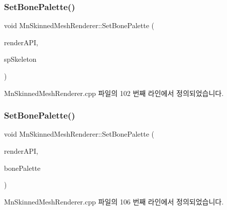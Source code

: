 \subsubsection{\texorpdfstring{Set\+Bone\+Palette()}{SetBonePalette()}\hspace{0.1cm}{\footnotesize\ttfamily [1/2]}}
{\footnotesize\ttfamily void Mn\+Skinned\+Mesh\+Renderer\+::\+Set\+Bone\+Palette (\begin{DoxyParamCaption}\item[{\hyperlink{class_m_n_l_1_1_mn_render_a_p_i}{Mn\+Render\+A\+PI} \&}]{render\+A\+PI,  }\item[{const std\+::shared\+\_\+ptr$<$ \hyperlink{class_m_n_l_1_1_mn_skeleton}{Mn\+Skeleton} $>$}]{sp\+Skeleton }\end{DoxyParamCaption})}



Mn\+Skinned\+Mesh\+Renderer.\+cpp 파일의 102 번째 라인에서 정의되었습니다.

\mbox{\label{class_m_n_l_1_1_mn_skinned_mesh_renderer_aca8b64e27a78b22b8550f46baa39df6a}} 
\subsubsection{\texorpdfstring{Set\+Bone\+Palette()}{SetBonePalette()}\hspace{0.1cm}{\footnotesize\ttfamily [2/2]}}
{\footnotesize\ttfamily void Mn\+Skinned\+Mesh\+Renderer\+::\+Set\+Bone\+Palette (\begin{DoxyParamCaption}\item[{\hyperlink{class_m_n_l_1_1_mn_render_a_p_i}{Mn\+Render\+A\+PI} \&}]{render\+A\+PI,  }\item[{const D3\+D11\+\_\+\+S\+U\+B\+R\+E\+S\+O\+U\+R\+C\+E\+\_\+\+D\+A\+TA}]{bone\+Palette }\end{DoxyParamCaption})}



Mn\+Skinned\+Mesh\+Renderer.\+cpp 파일의 106 번째 라인에서 정의되었습니다.

\mbox{\label{class_m_n_l_1_1_mn_skinned_mesh_renderer_a8041d4a0af22d9494bad1cb83e0584cb}} 
